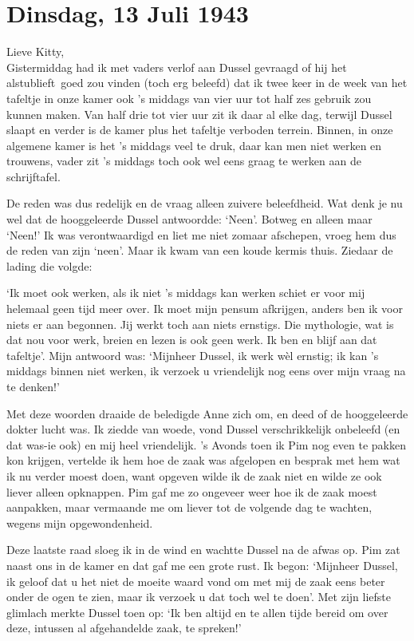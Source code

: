\documentclass{book}
\begin{document}
\section*{Dinsdag, 13 Juli 1943}

Lieve Kitty,\\
Gistermiddag had ik met vaders verlof aan Dussel gevraagd of hij
het alstublieft~goed zou vinden (toch erg beleefd) dat ik twee keer in de week
van het tafeltje in onze kamer ook 's middags van vier uur tot half zes gebruik
zou kunnen maken. Van half drie tot vier uur zit ik daar al elke dag, terwijl
Dussel slaapt en verder is de kamer plus het tafeltje verboden terrein. Binnen,
in onze algemene kamer is het 's middags veel te druk, daar kan men niet werken
en trouwens, vader zit 's middags toch ook wel eens graag te werken aan de
schrijftafel.

De reden was dus redelijk en de vraag alleen zuivere beleefdheid. Wat denk je nu
wel dat de hooggeleerde Dussel antwoordde: `Neen'. Botweg en alleen maar `Neen!'
Ik was verontwaardigd en liet me niet zomaar afschepen, vroeg hem dus de reden
van zijn `neen'. Maar ik kwam van een koude kermis thuis. Ziedaar de lading die
volgde:

`Ik moet ook werken, als ik niet 's middags kan werken schiet er voor mij
helemaal geen tijd meer over. Ik moet mijn pensum afkrijgen, anders ben ik voor
niets er aan begonnen. Jij werkt toch aan niets ernstigs.  Die mythologie, wat
is dat nou voor werk, breien en lezen is ook geen werk. Ik ben en blijf aan dat
tafeltje'. Mijn antwoord was: `Mijnheer Dussel, ik werk wèl ernstig; ik kan 's
middags binnen niet werken, ik verzoek u vriendelijk nog eens over mijn vraag na
te denken!'

Met deze woorden draaide de beledigde Anne zich om, en deed of de hooggeleerde
dokter lucht was. Ik ziedde van woede, vond Dussel verschrikkelijk onbeleefd (en
dat was-ie ook) en mij heel vriendelijk.  's Avonds toen ik Pim nog even te
pakken kon krijgen, vertelde ik hem hoe de zaak was afgelopen en besprak met hem
wat ik nu verder moest doen, want opgeven wilde ik de zaak niet en wilde ze ook
liever alleen opknappen. Pim gaf me zo ongeveer weer hoe ik de zaak moest
aanpakken, maar vermaande me om liever tot de volgende dag te wachten, wegens
mijn opgewondenheid.

Deze laatste raad sloeg ik in de wind en wachtte Dussel na de afwas op.  Pim zat
naast ons in de kamer en dat gaf me een grote rust. Ik begon: `Mijnheer Dussel,
ik geloof dat u het niet de moeite waard vond om met mij de zaak eens beter
onder de ogen te zien, maar ik verzoek u dat toch wel te doen'. Met zijn liefste
glimlach merkte Dussel toen op: `Ik ben altijd en te allen tijde bereid om over
deze, intussen al afgehandelde zaak, te spreken!'
\end{document}
